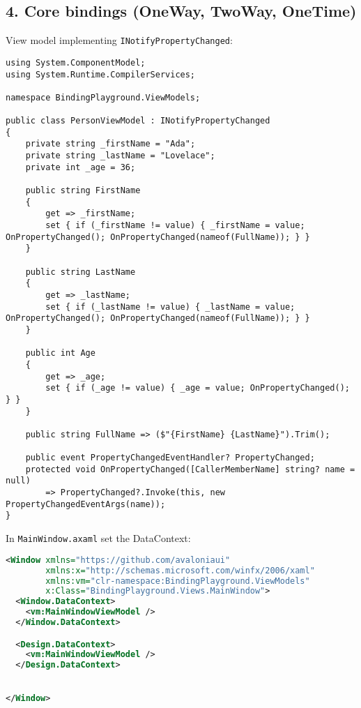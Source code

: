 \subsection{4. Core bindings (OneWay, TwoWay,
OneTime)}\label{core-bindings-oneway-twoway-onetime}

View model implementing
\passthrough{\lstinline!INotifyPropertyChanged!}:

\begin{lstlisting}
using System.ComponentModel;
using System.Runtime.CompilerServices;

namespace BindingPlayground.ViewModels;

public class PersonViewModel : INotifyPropertyChanged
{
    private string _firstName = "Ada";
    private string _lastName = "Lovelace";
    private int _age = 36;

    public string FirstName
    {
        get => _firstName;
        set { if (_firstName != value) { _firstName = value; OnPropertyChanged(); OnPropertyChanged(nameof(FullName)); } }
    }

    public string LastName
    {
        get => _lastName;
        set { if (_lastName != value) { _lastName = value; OnPropertyChanged(); OnPropertyChanged(nameof(FullName)); } }
    }

    public int Age
    {
        get => _age;
        set { if (_age != value) { _age = value; OnPropertyChanged(); } }
    }

    public string FullName => ($"{FirstName} {LastName}").Trim();

    public event PropertyChangedEventHandler? PropertyChanged;
    protected void OnPropertyChanged([CallerMemberName] string? name = null)
        => PropertyChanged?.Invoke(this, new PropertyChangedEventArgs(name));
}
\end{lstlisting}

In \passthrough{\lstinline!MainWindow.axaml!} set the DataContext:

\begin{lstlisting}[language=XML]
<Window xmlns="https://github.com/avaloniaui"
        xmlns:x="http://schemas.microsoft.com/winfx/2006/xaml"
        xmlns:vm="clr-namespace:BindingPlayground.ViewModels"
        x:Class="BindingPlayground.Views.MainWindow">
  <Window.DataContext>
    <vm:MainWindowViewModel />
  </Window.DataContext>

  <Design.DataContext>
    <vm:MainWindowViewModel />
  </Design.DataContext>


</Window>
\end{lstlisting}


